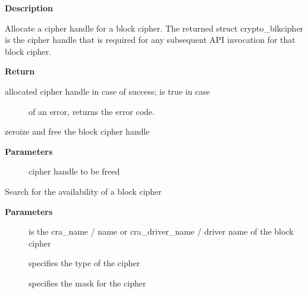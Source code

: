 \documentclass[a4paper,8pt,english]{sphinxmanual}
\begin{document}
\textbf{Description}

Allocate a cipher handle for a block cipher. The returned struct
crypto\_blkcipher is the cipher handle that is required for any subsequent
API invocation for that block cipher.

\textbf{Return}
\begin{description}
\item[{allocated cipher handle in case of success;  is true in case}] \leavevmode
of an error,  returns the error code.

\end{description}

\begin{fulllineitems}
\label{crypto/api-skcipher:c.crypto_free_blkcipher}
zeroize and free the block cipher handle

\end{fulllineitems}


\textbf{Parameters}
\begin{description}
\item[{}] \leavevmode
cipher handle to be freed

\end{description}

\begin{fulllineitems}
\label{crypto/api-skcipher:c.crypto_has_blkcipher}
Search for the availability of a block cipher

\end{fulllineitems}


\textbf{Parameters}
\begin{description}
\item[{}] \leavevmode
is the cra\_name / name or cra\_driver\_name / driver name of the
block cipher

\item[{}] \leavevmode
specifies the type of the cipher

\item[{}] \leavevmode
specifies the mask for the cipher

\end{description}
\end{document}
